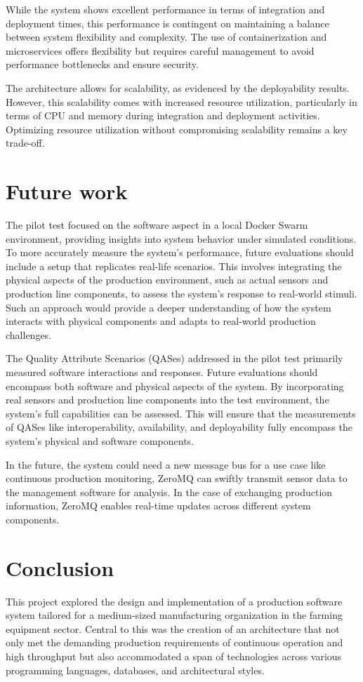 \documentclass[conference]{IEEEtran}
\begin{document}
While the system shows excellent performance in terms of integration and deployment times, this performance is contingent on maintaining a balance between system flexibility and complexity. The use of containerization and microservices offers flexibility but requires careful management to avoid performance bottlenecks and ensure security.

The architecture allows for scalability, as evidenced by the deployability results. However, this scalability comes with increased resource utilization, particularly in terms of CPU and memory during integration and deployment activities. Optimizing resource utilization without compromising scalability remains a key trade-off.



\section{Future work}
The pilot test focused on the software aspect in a local Docker Swarm environment, providing insights into system behavior under simulated conditions. To more accurately measure the system's performance, future evaluations should include a setup that replicates real-life scenarios. This involves integrating the physical aspects of the production environment, such as actual sensors and production line components, to assess the system's response to real-world stimuli. Such an approach would provide a deeper understanding of how the system interacts with physical components and adapts to real-world production challenges.

The Quality Attribute Scenarios (QASes) addressed in the pilot test primarily measured software interactions and responses. Future evaluations should encompass both software and physical aspects of the system. By incorporating real sensors and production line components into the test environment, the system's full capabilities can be assessed. This will ensure that the measurements of QASes like interoperability, availability, and deployability fully encompass the system's physical and software components.

In the future, the system could need a new message bus for a use case like continuous production monitoring, ZeroMQ can swiftly transmit sensor data to the management software for analysis. In the case of exchanging production information, ZeroMQ enables real-time updates across different system components.


\section{Conclusion}
This project explored the design and implementation of a production software system tailored for a medium-sized manufacturing organization in the farming equipment sector. Central to this was the creation of an architecture that not only met the demanding production requirements of continuous operation and high throughput but also accommodated a span of technologies across various programming languages, databases, and architectural styles.
\end{document}
